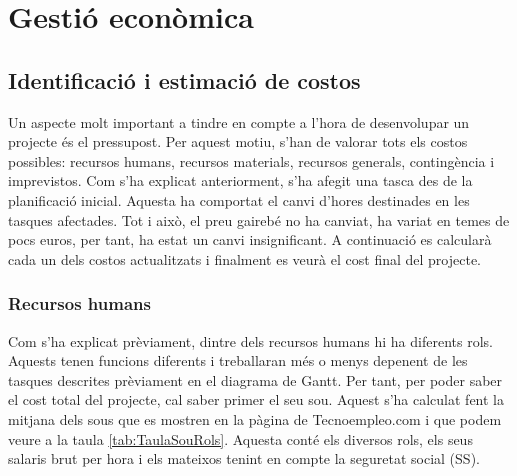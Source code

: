 \documentclass[a4paper]{article}
\begin{document}
\newpage
\section{Gestió econòmica}
\subsection{Identificació i estimació de costos}
Un aspecte molt important a tindre en compte a l'hora de desenvolupar un projecte és el pressupost. Per aquest motiu, s'han de valorar tots els costos possibles: recursos humans, recursos materials, recursos generals, contingència i imprevistos. 
Com s'ha explicat anteriorment, s'ha afegit una tasca des de la planificació inicial. Aquesta ha comportat el canvi d'hores destinades en les tasques afectades. Tot i això, el preu gairebé no ha canviat, ha variat en temes de pocs euros, per tant, ha estat un canvi insignificant. A continuació es calcularà cada un dels costos actualitzats i finalment es veurà el cost final del projecte.

\subsubsection{Recursos humans}
Com s'ha explicat prèviament, dintre dels recursos humans hi ha diferents rols. Aquests tenen funcions diferents i treballaran més o menys depenent de les tasques descrites prèviament en el diagrama de Gantt. Per tant, per poder saber el cost total del projecte, cal saber primer el seu sou. Aquest s'ha calculat fent la  mitjana dels sous que es mostren en la pàgina de Tecnoempleo.com \cite{tecnoEmpleo} i que podem veure a la taula \ref{tab:TaulaSouRols}. Aquesta conté els diversos rols, els seus salaris brut per hora i els mateixos tenint en compte la seguretat social (SS). 
\end{document}
